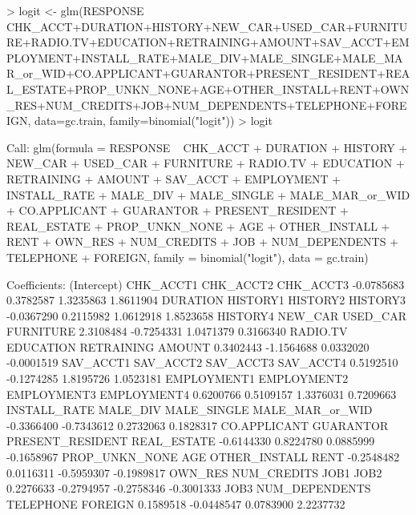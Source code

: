 \documentclass{article}
\begin{document}
\begin{Schunk}
\begin{Sinput}
> logit <- glm(RESPONSE ~ CHK_ACCT+DURATION+HISTORY+NEW_CAR+USED_CAR+FURNITURE+RADIO.TV+EDUCATION+RETRAINING+AMOUNT+SAV_ACCT+EMPLOYMENT+INSTALL_RATE+MALE_DIV+MALE_SINGLE+MALE_MAR_or_WID+CO.APPLICANT+GUARANTOR+PRESENT_RESIDENT+REAL_ESTATE+PROP_UNKN_NONE+AGE+OTHER_INSTALL+RENT+OWN_RES+NUM_CREDITS+JOB+NUM_DEPENDENTS+TELEPHONE+FOREIGN, data=gc.train, family=binomial("logit"))
> logit
\end{Sinput}
\begin{Soutput}
Call:  glm(formula = RESPONSE ~ CHK_ACCT + DURATION + HISTORY + NEW_CAR + 
    USED_CAR + FURNITURE + RADIO.TV + EDUCATION + RETRAINING + 
    AMOUNT + SAV_ACCT + EMPLOYMENT + INSTALL_RATE + MALE_DIV + 
    MALE_SINGLE + MALE_MAR_or_WID + CO.APPLICANT + GUARANTOR + 
    PRESENT_RESIDENT + REAL_ESTATE + PROP_UNKN_NONE + AGE + OTHER_INSTALL + 
    RENT + OWN_RES + NUM_CREDITS + JOB + NUM_DEPENDENTS + TELEPHONE + 
    FOREIGN, family = binomial("logit"), data = gc.train)

Coefficients:
     (Intercept)         CHK_ACCT1         CHK_ACCT2         CHK_ACCT3  
      -0.0785683         0.3782587         1.3235863         1.8611904  
        DURATION          HISTORY1          HISTORY2          HISTORY3  
      -0.0367290         0.2115982         1.0612918         1.8523658  
        HISTORY4           NEW_CAR          USED_CAR         FURNITURE  
       2.3108484        -0.7254331         1.0471379         0.3166340  
        RADIO.TV         EDUCATION        RETRAINING            AMOUNT  
       0.3402443        -1.1564688         0.0332020        -0.0001519  
       SAV_ACCT1         SAV_ACCT2         SAV_ACCT3         SAV_ACCT4  
       0.5192510        -0.1274285         1.8195726         1.0523181  
     EMPLOYMENT1       EMPLOYMENT2       EMPLOYMENT3       EMPLOYMENT4  
       0.6200766         0.5109157         1.3376031         0.7209663  
    INSTALL_RATE          MALE_DIV       MALE_SINGLE   MALE_MAR_or_WID  
      -0.3366400        -0.7343612         0.2732063         0.1828317  
    CO.APPLICANT         GUARANTOR  PRESENT_RESIDENT       REAL_ESTATE  
      -0.6144330         0.8224780         0.0885999        -0.1658967  
  PROP_UNKN_NONE               AGE     OTHER_INSTALL              RENT  
      -0.2548482         0.0116311        -0.5959307        -0.1989817  
         OWN_RES       NUM_CREDITS              JOB1              JOB2  
       0.2276633        -0.2794957        -0.2758346        -0.3001333  
            JOB3    NUM_DEPENDENTS         TELEPHONE           FOREIGN  
       0.1589518        -0.0448547         0.0783900         2.2237732  


\end{Soutput}
\end{Schunk}
\end{document}
